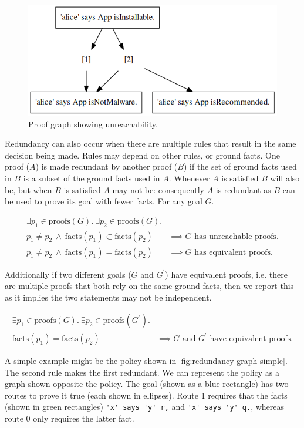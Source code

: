 \documentclass[thesis.tex]{subfiles}
\begin{document}
\begin{figure}
  \centering
  \includegraphics[width=0.5\linewidth]{./figures/unreachability.png}
  \caption{Proof graph showing unreachability.}
  \label{fig:unreachability}
\end{figure}

Redundancy can also occur when there are multiple rules that result in the
same decision being made.  Rules may depend on other rules, or ground
facts.  One proof ($A$) is made redundant by another proof ($B$) if
the set of ground facts used in $B$ is a subset of the ground facts
used in $A$. Whenever $A$ is satisfied $B$ will also be, but when $B$
is satisfied $A$ may not be: consequently $A$ is redundant as $B$ can
be used to prove its goal with fewer facts.  For any goal
$G$.

\begin{align*}
  \exists p_1 \in \text{proofs}(G).~\exists p_2 \in \text{proofs}(G).        & \\
  p_1 \not= p_2~\wedge~\text{facts}(p_1) \subset \text{facts}(p_2)           & \implies G\text{ has unreachable proofs.} \\
  p_1 \not= p_2~\wedge~\text{facts}(p_1) = \text{facts}(p_2)                 & \implies G\text{ has equivalent proofs.}
\end{align*}

Additionally if two different goals ($G$ and $G^\prime$) have
equivalent proofs, i.e. there are multiple proofs that both rely on the same ground facts, then we report this as it implies the two
statements may not be independent.

\begin{align*}
  \exists p_1 \in \text{proofs}(G).~\exists p_2 \in \text{proofs}(G^\prime). & \\
  \text{facts}(p_1) = \text{facts}(p_2)                                      & \implies \text{$G$ and $G^\prime$ have equivalent proofs.}
\end{align*}

A simple example might be the policy shown in \autoref{fig:redundancy-graph-simple}.
The second rule makes the first redundant.  We can represent the policy
as a graph shown opposite the policy.  The goal (shown as a blue rectangle) has two routes
to prove it true (each shown in ellipses).  Route 1 requires that the facts
(shown in green rectangles) \lstinline!'x' says 'y' r,! and
\lstinline!'x' says 'y' q.!, whereas route 0 only requires the
latter fact.
\end{document}
